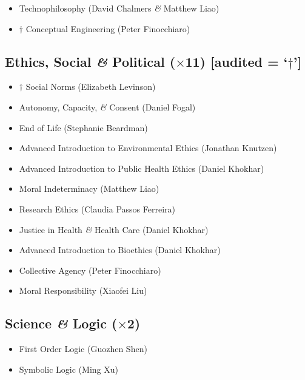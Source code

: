 \documentclass[10pt]{article}
\begin{document}
\begin{itemize}
\item Technophilosophy (David Chalmers \emph{\&} Matthew Liao)
\item \begin{math}\dagger\end{math} Conceptual Engineering (Peter Finocchiaro)
\end{itemize}

\subsection*{Ethics, Social \emph{\&} Political (\begin{math}\times\end{math}11) [audited = `\begin{math}\dagger\end{math}']}

\begin{itemize}
\item \begin{math}\dagger\end{math} Social Norms (Elizabeth Levinson)
\item Autonomy, Capacity, \emph{\&} Consent (Daniel Fogal)
\item End of Life (Stephanie Beardman)
\item Advanced Introduction to Environmental Ethics (Jonathan Knutzen)
\item Advanced Introduction to Public Health Ethics (Daniel Khokhar)
\item Moral Indeterminacy (Matthew Liao)
\item Research Ethics (Claudia Passos Ferreira)
\item Justice in Health \emph{\&} Health Care (Daniel Khokhar)
\item Advanced Introduction to Bioethics (Daniel Khokhar)
\item Collective Agency (Peter Finocchiaro)
\item Moral Responsibility (Xiaofei Liu)
\end{itemize}

\subsection*{Science \emph{\&} Logic (\begin{math}\times\end{math}2)}

\begin{itemize}
\item First Order Logic (Guozhen Shen)
\item Symbolic Logic (Ming Xu)
\end{itemize}
\end{document}
